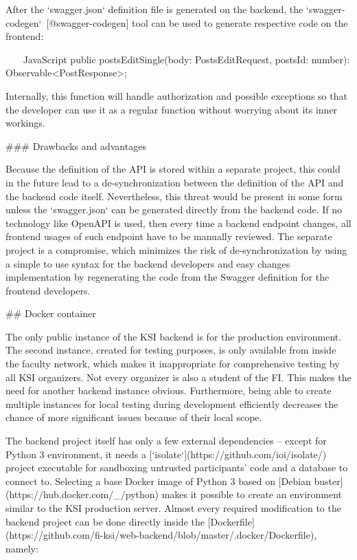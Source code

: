 \documentclass[
  digital, %
  oneside, %
  lof,     %
  nolot,     %
]{fithesis4}
\begin{document}
{After the `swagger.json` definition file is generated on the backend, the `swagger-codegen`~[@swagger-codegen] tool can be used to generate respective code on the frontend:

~~~ JavaScript
public postsEditSingle(body: PostsEditRequest, postsId: number): Observable<PostResponse>;
~~~

Internally, this function will handle authorization and possible exceptions so that the developer can use it as a regular function without worrying about its inner workings.

### Drawbacks and advantages

Because the definition of the API is stored within a separate project, this could in the future lead to a de-synchronization between the definition of the API and the backend code itself. Nevertheless, this threat would be present in some form unless the `swagger.json` can be generated directly from the backend code. If no technology like OpenAPI is used, then every time a backend endpoint changes, all frontend usages of such endpoint have to be manually reviewed. The separate project is a compromise, which minimizes the risk of de-synchronization by using a simple to use syntax for the backend developers and easy changes implementation by regenerating the code from the Swagger definition for the frontend developers.

## Docker container

The only public instance of the KSI backend is for the production environment. The second instance, created for testing purposes, is only available from inside the faculty network, which makes it inappropriate for comprehensive testing by all KSI organizers. Not every organizer is also a student of the FI. This makes the need for another backend instance obvious. Furthermore, being able to create multiple instances for local testing during development efficiently decreases the chance of more significant issues because of their local scope.

The backend project itself has only a few external dependencies -- except for Python 3 environment, it needs a [`isolate`](https://github.com/ioi/isolate/) project executable for sandboxing untrusted participants' code and a database to connect to. Selecting a base Docker image of Python 3 based on [Debian buster](https://hub.docker.com/_/python) makes it possible to create an environment similar to the KSI production server. Almost every required modification to the backend project can be done directly inside the [Dockerfile](https://github.com/fi-ksi/web-backend/blob/master/.docker/Dockerfile), namely:

}
\end{document}
